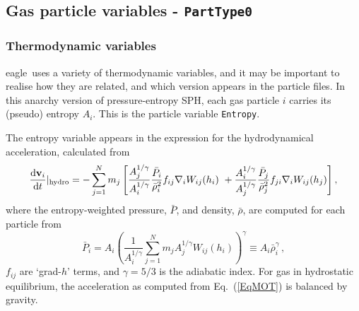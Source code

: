 \documentclass[10pt, a4paper]{article}
\newcommand{\eagle}{{\sc eagle}}
\begin{document}
\subsection{Gas particle variables - \texttt{PartType0}}
\subsubsection{Thermodynamic variables}
\label{SecThermo}

\eagle\ uses a variety of thermodynamic variables, and it may be important to realise how they are related, and which version appears in the particle files. In this {\sc anarchy} version of pressure-entropy SPH, each gas particle $i$ carries its (pseudo) entropy $A_i$. This is the particle variable \texttt{Entropy}.

The entropy variable appears in the expression for the hydrodynamical acceleration, calculated from
\begin{equation}
\frac{{\rm d}\mathbf{v}_i}{{\rm d}t}|_{\rm hydro}=-\sum_{j=1}^N m_j  \left[\frac{A_j^{1/\gamma}}{A_i^{1/\gamma}}\frac{\bar{P}_i}{\bar{\rho}_i^2}f_{ij}\nabla_i W_{ij}(h_i) ~ + \frac{A_i^{1/\gamma}}{A_j^{1/\gamma}}\frac{\bar{P}_j}{\bar{\rho}_j^2}f_{ji}\nabla_i W_{ij}(h_j) \right] , \label{EqMOT}
\end{equation}
where the entropy-weighted pressure, $\bar{P}$, and density, $\bar{\rho}$, are computed for each particle from
\begin{equation}
\bar{P}_i = A_i \left(\frac{1}{A_i^{1/\gamma}}\sum_{j=1}^N m_j A_j^{1/\gamma} W_{ij}(h_i)\right)^{\gamma} \equiv A_i \bar{\rho}_i^{\gamma} \,, \label{EqpS}
\end{equation}
$f_{ij}$ are `grad-$h$' terms, and $\gamma=5/3$ is the adiabatic index. For gas in hydrostatic equilibrium, the acceleration as computed from Eq.~(\ref{EqMOT}) is balanced by gravity. 
\end{document}
